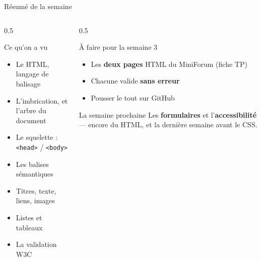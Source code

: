 \documentclass[aspectratio=169,11pt]{beamer}
\begin{document}
\begin{frame}{Résumé de la semaine}
  \begin{columns}[T]
    \begin{column}{0.5\textwidth}
      \begin{block}{Ce qu'on a vu}
        \begin{itemize}
          \item Le HTML, langage de balisage
          \item L'imbrication, et l'arbre du document
          \item Le squelette : \texttt{<head>} / \texttt{<body>}
          \item Les balises sémantiques
          \item Titres, texte, liens, images
          \item Listes et tableaux
          \item La validation W3C
        \end{itemize}
      \end{block}
    \end{column}
    \begin{column}{0.5\textwidth}
      \begin{alertblock}{À faire pour la semaine 3}
        \begin{itemize}
          \item Les \textbf{deux pages} HTML du MiniForum (fiche TP)
          \item Chacune valide \textbf{sans erreur}
          \item Pousser le tout sur GitHub
        \end{itemize}
      \end{alertblock}
      \vspace{0.15cm}
      \begin{exampleblock}{La semaine prochaine}
        Les \textbf{formulaires} et l'\textbf{accessibilité} --- encore du HTML, et la dernière semaine avant le CSS.
      \end{exampleblock}
    \end{column}
  \end{columns}
\end{frame}

{
\begin{frame}[plain]
\end{frame}
}
\end{document}
